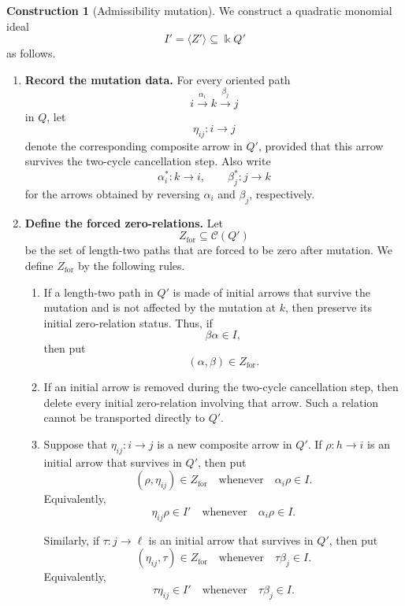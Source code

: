 \documentclass[11pt]{article}
\newcommand{\K}{\Bbbk}
\theoremstyle{plain}
\theoremstyle{definition}
\newtheorem{construction}[theorem]{Construction}
\theoremstyle{remark}
\begin{document}
\begin{construction}[Admissibility mutation]
\label{constr:admissibilityfirst}
We construct a quadratic monomial ideal
\[
  I'=\langle Z'\rangle\subseteq \K Q'
\]
as follows.

\begin{enumerate}[label=\textbf{Step \arabic*.},leftmargin=3em]
  \item \textbf{Record the mutation data.}
  For every oriented path
  \[
    i\xrightarrow{\alpha_i} k\xrightarrow{\beta_j} j
  \]
  in \(Q\), let
  \[
    \eta_{ij}:i\to j
  \]
  denote the corresponding composite arrow in \(Q'\), provided that this arrow
  survives the two-cycle cancellation step.  Also write
  \[
    \alpha_i^*:k\to i,
    \qquad
    \beta_j^*:j\to k
  \]
  for the arrows obtained by reversing \(\alpha_i\) and \(\beta_j\), respectively.

  \item \textbf{Define the forced zero-relations.}
  Let
  \[
    Z_{\mathrm{for}}\subseteq \mathcal C(Q')
  \]
  be the set of length-two paths that are forced to be zero after mutation.
  We define \(Z_{\mathrm{for}}\) by the following rules.

  \begin{enumerate}[label=(\alph*),leftmargin=2.5em]
    \item If a length-two path in \(Q'\) is made of initial arrows that survive the
    mutation and is not affected by the mutation at \(k\), then preserve its
    initial zero-relation status.  Thus, if
    \[
      \beta\alpha\in I,
    \]
    then put
    \[
      (\alpha,\beta)\in Z_{\mathrm{for}}.
    \]

    \item If an initial arrow is removed during the two-cycle cancellation step,
    then delete every initial zero-relation involving that arrow.  Such a relation
    cannot be transported directly to \(Q'\).

    \item Suppose that \(\eta_{ij}:i\to j\) is a new composite arrow in \(Q'\).
    If \(\rho:h\to i\) is an initial arrow that survives in \(Q'\), then put
    \[
      (\rho,\eta_{ij})\in Z_{\mathrm{for}}
      \quad\text{whenever}\quad
      \alpha_i\rho\in I.
    \]
    Equivalently,
    \[
      \eta_{ij}\rho\in I'
      \quad\text{whenever}\quad
      \alpha_i\rho\in I.
    \]

    Similarly, if \(\tau:j\to \ell\) is an initial arrow that survives in \(Q'\),
    then put
    \[
      (\eta_{ij},\tau)\in Z_{\mathrm{for}}
      \quad\text{whenever}\quad
      \tau\beta_j\in I.
    \]
    Equivalently,
    \[
      \tau\eta_{ij}\in I'
      \quad\text{whenever}\quad
      \tau\beta_j\in I.
    \]


\end{enumerate}
\end{enumerate}
\end{construction}
\end{document}

